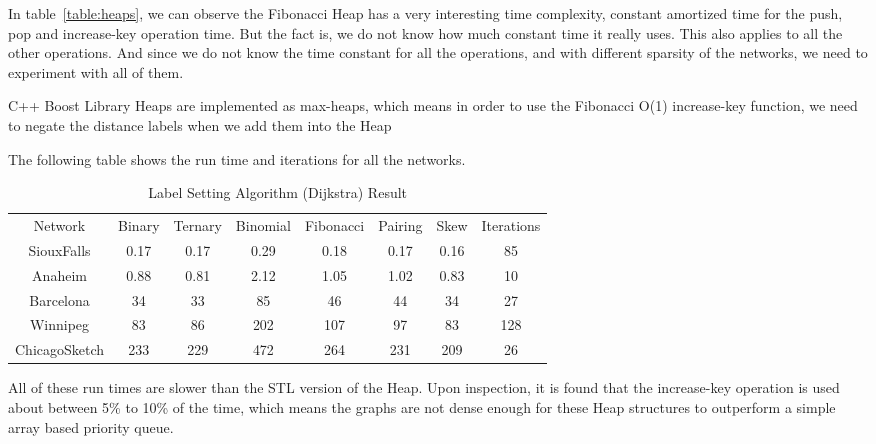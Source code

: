In table~\ref{table:heaps},
we can observe the Fibonacci Heap has a very interesting time complexity,
constant amortized time for the push, pop and increase-key operation time.
But the fact is,
we do not know how much constant time it really uses.
This also applies to all the other operations.
And since we do not know the time constant for all the operations,
and with different sparsity of the networks,
we need to experiment with all of them.

C++ Boost Library Heaps are implemented as max-heaps,
which means in order to use the Fibonacci O(1) increase-key function,
we need to negate the distance labels when we add them into the Heap

The following table shows the run time and iterations for all the networks.
\begin{table}[H]
    \centering
    \begin{tabular}{cccccccc}
        Network       & Binary & Ternary & Binomial & Fibonacci & Pairing & Skew & Iterations \\
        SiouxFalls    & 0.17 & 0.17 & 0.29 & 0.18 & 0.17 & 0.16 & 85 \\
        Anaheim       & 0.88 & 0.81 & 2.12  & 1.05 & 1.02 & 0.83 & 10 \\
        Barcelona     & 34 & 33 & 85 & 46  & 44 & 34 & 27 \\
        Winnipeg      & 83 & 86 & 202 & 107 & 97 & 83 & 128 \\
        ChicagoSketch & 233 & 229 & 472 & 264 & 231 & 209 & 26
    \end{tabular}
    \caption{Label Setting Algorithm (Dijkstra) Result}
    \label{table:dijkstraresult}
\end{table}

All of these run times are slower than the STL version of the Heap.
Upon inspection,
it is found that the increase-key operation is used about between 5\% to 10\%
of the time,
which means the graphs are not dense enough for these Heap structures to outperform a
simple array based priority queue.

